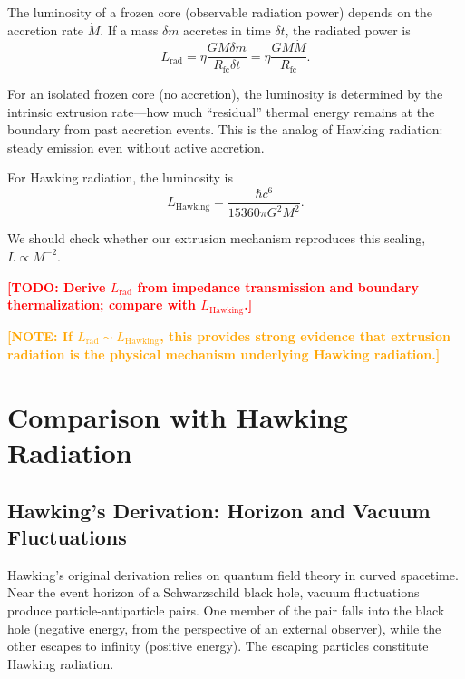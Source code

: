 \documentclass[12pt,a4paper]{article}
\newcommand{\TODO}[1]{\textcolor{red}{\textbf{[TODO: #1]}}}
\newcommand{\NOTE}[1]{\textcolor{orange}{\textbf{[NOTE: #1]}}}
\newcommand{\Rfc}{R_\text{fc}}
\theoremstyle{definition}
\begin{document}
The luminosity of a frozen core (observable radiation power) depends on the accretion rate $\dot{M}$. If a mass $\delta m$ accretes in time $\delta t$, the radiated power is
\begin{equation}
L_\text{rad} = \eta \frac{GM \delta m}{\Rfc \delta t} = \eta \frac{GM \dot{M}}{\Rfc}.
\label{eq:L_rad}
\end{equation}

For an isolated frozen core (no accretion), the luminosity is determined by the intrinsic extrusion rate—how much ``residual'' thermal energy remains at the boundary from past accretion events. This is the analog of Hawking radiation: steady emission even without active accretion.

For Hawking radiation, the luminosity is
\begin{equation}
L_\text{Hawking} = \frac{\hbar c^6}{15360 \pi G^2 M^2}.
\label{eq:L_Hawking}
\end{equation}

We should check whether our extrusion mechanism reproduces this scaling, $L \propto M^{-2}$.

\TODO{Derive $L_\text{rad}$ from impedance transmission and boundary thermalization; compare with $L_\text{Hawking}$.}

\NOTE{If $L_\text{rad} \sim L_\text{Hawking}$, this provides strong evidence that extrusion radiation is the physical mechanism underlying Hawking radiation.}

\section{Comparison with Hawking Radiation}
\label{sec:comparison_hawking}

\subsection{Hawking's Derivation: Horizon and Vacuum Fluctuations}
\label{subsec:hawking_derivation}

Hawking's original derivation \cite{Hawking1974,Hawking1975} relies on quantum field theory in curved spacetime. Near the event horizon of a Schwarzschild black hole, vacuum fluctuations produce particle-antiparticle pairs. One member of the pair falls into the black hole (negative energy, from the perspective of an external observer), while the other escapes to infinity (positive energy). The escaping particles constitute Hawking radiation.
\end{document}
